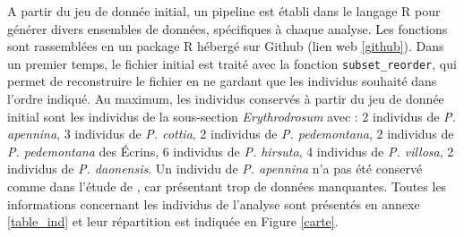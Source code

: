 A partir du jeu de donnée initial, un pipeline est établi dans le langage R \citep{RTeam2017} pour générer divers ensembles de données, spécifiques à chaque analyse. Les fonctions sont rassemblées en un package R hébergé sur Github (lien web \ref{github}). Dans un premier temps, le fichier initial est traité avec la fonction \verb|subset_reorder|, qui permet de reconstruire le fichier en ne gardant que les individus souhaité dans l'ordre indiqué. Au maximum, les individus conservés à partir du jeu de donnée initial sont les individus de la sous-section \textit{Erythrodrosum} avec :
2 individus de \textit{P. apennina}, 
3 individus de \textit{P. cottia}, 
2 individus de \textit{P. pedemontana}, 
2 individus de \textit{P. pedemontana} des Écrins, 
6 individus de \textit{P. hirsuta}, 
4 individus de \textit{P. villosa}, 
2 individus de \textit{P. daonensis}.
Un individu de \textit{P. apennina} n'a pas été conservé comme dans l'étude de \citet{Boucher2016a}, car présentant trop de données manquantes. Toutes les informations concernant les individus de l'analyse sont présentés en annexe \ref{table_ind} et leur répartition est indiquée en Figure \ref{carte}.
 
